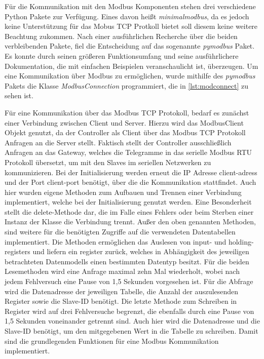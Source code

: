 

Für die Kommunikation mit den Modbus Komponenten stehen drei verschiedene Python Pakete zur Verfügung. Eines davon heißt \textit{minimalmodbus}, da es jedoch keine Unterstützung für das Mobus TCP Protkoll bietet soll diesem keine weitere Beachtung zukommen. Nach einer ausführlichen Recherche über die beiden verbleibenden Pakete, fiel die Entscheidung auf das sogenannte \textit{pymodbus} Paket. Es konnte durch seinen größeren Funktionsumfang und seine ausführlichere Dokumentation, die mit einfachen Beispielen veranschaulicht ist, überzeugen.
Um eine Kommunikation über Modbus zu ermöglichen,  wurde mithilfe des \textit{pymodbus} Pakets die Klasse \textit{ModbusConnection}  programmiert, die in \ref{lst:modconnect} zu sehen ist.

Für eine Kommunikation über das Modbus TCP Protokoll, bedarf es zunächst einer Verbindung zwischen Client und Server. Hierzu wird das ModbusClient Objekt genutzt, da der Controller als Client über das Modbus TCP Protokoll Anfragen an die Server stellt. Faktisch stellt der Controller ausschließlich Anfragen an das Gateway, welches die Telegramme in das serielle Modbus RTU Protokoll übersetzt, um mit den Slaves im seriellen Netzwerken zu kommunizieren. Bei der Initialisierung werden erneut die IP Adresse client-adress und der Port client-port benötigt, über die die Kommunikation stattfindet. Auch hier wurden eigene Methoden zum Aufbauen und Trennen einer Verbindung implementiert, welche bei der Initialisierung genutzt werden. Eine Besonderheit stellt die delete-Methode dar, die im Falle eines Fehlers oder beim Sterben einer Instanz der Klasse die Verbindung trennt. 
Außer den oben genannten Methoden, sind weitere für die benötigten Zugriffe auf die verwendeten Datentabellen implementiert. Die Methoden ermöglichen das Auslesen von input- und holding-registers und liefern ein register zurück, welches in Abhängigkeit des jeweiligen betrachteten Datenmodells einen bestimmten Datentyp besitzt. Für die beiden Lesemethoden wird eine Anfrage maximal zehn Mal wiederholt, wobei nach jedem Fehlversuch eine Pause von 1,5 Sekunden vorgesehen ist. Für die Abfrage wird die Datenadresse der jeweiligen Tabelle, die Anzahl der auszulesenden Register sowie die Slave-ID benötigt. Die letzte Methode zum Schreiben in Register wird auf drei Fehlversuche begrenzt, die ebenfalls durch eine Pause von 1,5 Sekunden voneinander getrennt sind. Auch hier wird die Datenadresse und die Slave-ID benötigt, um den mitgegebenen Wert in die Tabelle zu schreiben.
Damit sind die grundlegenden Funktionen für eine Modbus Kommunikation implementiert.

